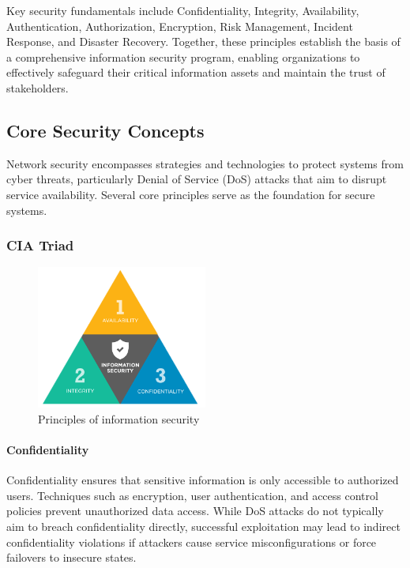 \documentclass[12pt]{report}
\begin{document}
Key security fundamentals include Confidentiality, Integrity, Availability, Authentication, Authorization, Encryption, Risk Management, Incident Response, and Disaster Recovery. Together, these principles establish the basis of a comprehensive information security program, enabling organizations to effectively safeguard their critical information assets and maintain the trust of stakeholders.\cite{ibm_security_fundamental}

\subsection{Core Security Concepts}
Network security encompasses strategies and technologies to protect systems from cyber threats, particularly Denial of Service (DoS) attacks that aim to disrupt service availability. Several core principles serve as the foundation for secure systems.

\subsubsection{CIA Triad}
\begin{figure}[ht]
    \centering
    \includegraphics[width=0.5\textwidth]{images/CIA-graph.png}
    \caption{Principles of information security}
    \label{fig:cia-graph}
\end{figure}

\paragraph{Confidentiality} 
Confidentiality ensures that sensitive information is only accessible to authorized users. Techniques such as encryption, user authentication, and access control policies prevent unauthorized data access. While DoS attacks do not typically aim to breach confidentiality directly, successful exploitation may lead to indirect confidentiality violations if attackers cause service misconfigurations or force failovers to insecure states.
\end{document}
